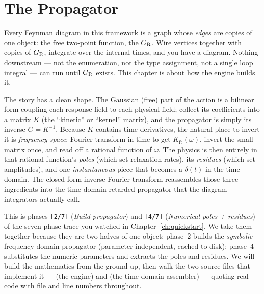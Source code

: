 \chapter{The Propagator}\label{ch:propagator}

Every Feynman diagram in this framework is a graph whose \emph{edges} are
copies of one object: the free two-point function, the 
$G_{\mathrm R}$. Wire vertices together with copies of $G_{\mathrm R}$, integrate over the
internal times, and you have a diagram. Nothing downstream --- not the
enumeration, not the type assignment, not a single loop integral --- can run
until $G_{\mathrm R}$ exists. This chapter is about how the engine builds it.

The story has a clean shape. The Gaussian (free) part of the \msrjd{} action is
a bilinear form coupling each response field to each physical field; collect its
coefficients into a matrix $K$ (the ``kinetic'' or ``kernel'' matrix), and the
propagator is simply its inverse $G = K^{-1}$. Because $K$ contains time
derivatives, the natural place to invert it is \emph{frequency space}: Fourier
transform in time to get $K_{\mathrm{ft}}(\omega)$, invert the small matrix once,
and read off a rational function of $\omega$. The physics is then entirely in
that rational function's \emph{poles} (which set relaxation rates), its
\emph{residues} (which set amplitudes), and one \emph{instantaneous} piece that
becomes a $\delta(t)$ in the time domain. The closed-form inverse Fourier
transform reassembles those three ingredients into the time-domain retarded
propagator that the diagram integrators actually call.

This is phases \texttt{[2/7]} (\emph{Build propagator}) and \texttt{[4/7]}
(\emph{Numerical poles + residues}) of the seven-phase trace you watched in
Chapter~\ref{ch:quickstart}. We take them together because they are two halves
of one object: phase~2 builds the \emph{symbolic} frequency-domain propagator
(parameter-independent, cached to disk); phase~4 substitutes the numeric
parameters and extracts the poles and residues. We will build the mathematics
from the ground up, then walk the two source files that implement it ---
 (the engine) and
 (the time-domain
assembler) --- quoting real code with file and line numbers throughout.

